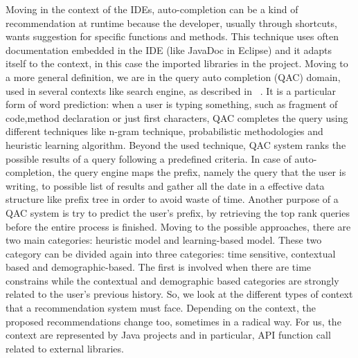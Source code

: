 Moving in the context of the IDEs, auto-completion can be a kind of recommendation at runtime because the developer, usually through shortcuts, wants suggestion for specific functions and methods. This technique uses often documentation embedded in the IDE (like JavaDoc in Eclipse) and it adapts itself  to the context, in this case the imported libraries in the project. Moving to a more general definition, we are in the query auto completion (QAC) domain, used in several contexts like search engine, as described in ~\cite{DBLP:journals/ftir/CaiR16}. It is a particular form of word prediction: when a user is typing something, such as fragment of code,method declaration or just first characters, QAC completes the query using different techniques like n-gram technique, probabilistic methodologies and heuristic learning algorithm. Beyond the used technique, QAC system ranks the possible results of a query following a predefined criteria. In case of auto-completion, the query engine maps the prefix, namely the query that the user is writing, to possible list of results and gather all the date in a effective data structure like prefix tree in order to avoid waste of time. Another purpose of a QAC system is try to predict the user's prefix, by retrieving the top rank queries before the entire process is finished. Moving to the possible approaches, there are two main categories: heuristic model and learning-based model. These two category can be divided again into three categories: time sensitive, contextual based and demographic-based. The first is involved when there are time constrains while the contextual and demographic based categories are strongly related to the user's previous history. \newline
So, we look at the different types of context that a recommendation system must face. Depending on the context, the proposed recommendations change too, sometimes in a radical way. For us, the context are represented by Java projects and in particular, API function call related to external libraries.

